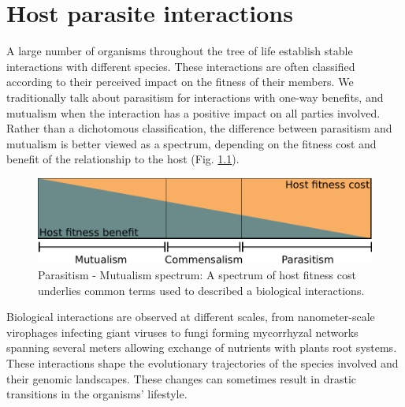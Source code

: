 
\chapter{Host parasite interactions} %

\label{ch:01-01} %


A large number of organisms throughout the tree of life establish stable interactions with different species. These interactions are often classified according to their perceived impact on the fitness of their members. We traditionally talk about parasitism for interactions with one-way benefits, and mutualism when the interaction has a positive impact on all parties involved. Rather than a dichotomous classification, the difference between parasitism and mutualism is better viewed as a spectrum, depending on the \Gls{fitness} cost and benefit of the relationship to the host (Fig. \ref{fig:01-01:mutualism}).

\begin{figure}[b]
    \includegraphics[width=\textwidth]{Parts/Part01/gfx/parasitism_mutualism.pdf}
    \caption[Parasitism - Mutualism spectrum.]{Parasitism - Mutualism spectrum: A spectrum of host \Gls{fitness} cost underlies common terms used to described a biological interactions.}
	\label{fig:01-01:mutualism}
\end{figure}

Biological interactions are observed at different scales, from nanometer-scale virophages infecting giant viruses to fungi forming mycorrhyzal networks spanning several meters \citep{johnsonFunctioningMycorrhizalAssociations1997,selosseMycorrhizalNetworksLiaisons2006} allowing exchange of nutrients with plants root systems. These interactions shape the evolutionary trajectories of the species involved and their genomic landscapes. These changes can sometimes result in drastic transitions in the organisms' lifestyle. 

